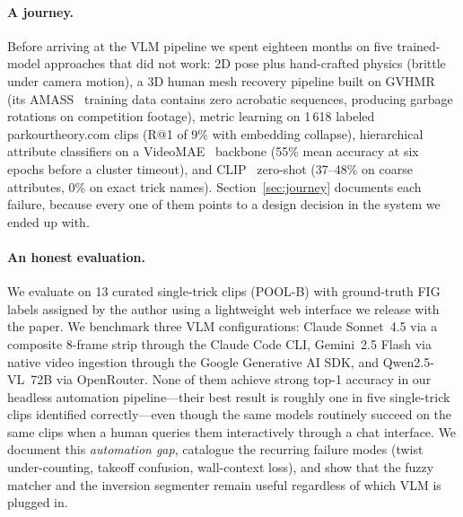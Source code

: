 \paragraph{A journey.}
Before arriving at the VLM pipeline we spent eighteen months on five
trained-model approaches that did not work: 2D pose plus hand-crafted
physics (brittle under camera motion), a 3D human mesh recovery
pipeline built on GVHMR~\cite{shen2024gvhmr} (its AMASS~\cite{mahmood2019amass}
training data contains zero acrobatic sequences, producing garbage
rotations on competition footage), metric learning on 1\,618 labeled
parkourtheory.com clips (R@1 of 9\% with embedding collapse),
hierarchical attribute classifiers on a VideoMAE~\cite{tong2022videomae}
backbone (55\% mean accuracy at six epochs before a cluster timeout),
and CLIP~\cite{radford2021clip} zero-shot (37--48\% on coarse
attributes, 0\% on exact trick names). Section~\ref{sec:journey}
documents each failure, because every one of them points to a design
decision in the system we ended up with.

\paragraph{An honest evaluation.}
We evaluate \sys{} on 13 curated single-trick clips (POOL-B) with
ground-truth FIG labels assigned by the author using a lightweight
web interface we release with the paper. We benchmark three VLM
configurations: Claude Sonnet~4.5 via a composite 8-frame strip
through the Claude Code CLI, Gemini~2.5 Flash via native video
ingestion through the Google Generative AI SDK, and Qwen2.5-VL~72B
via OpenRouter. None of them achieve strong top-1 accuracy in our
headless automation pipeline---their best result is roughly one in
five single-trick clips identified correctly---even though the same
models routinely succeed on the same clips when a human queries them
interactively through a chat interface. We document this
\emph{automation gap}, catalogue the recurring failure modes
(twist under-counting, takeoff confusion, wall-context loss), and
show that the fuzzy matcher and the inversion segmenter remain
useful regardless of which VLM is plugged in.

